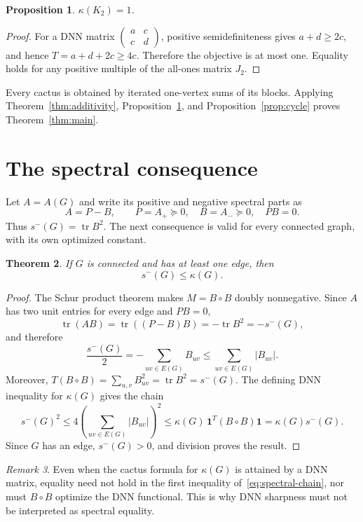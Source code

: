 \documentclass[11pt]{article}
\newtheorem{theorem}{Theorem}[section]
\newtheorem{proposition}[theorem]{Proposition}
\theoremstyle{remark}
\newtheorem{remark}[theorem]{Remark}
\newcommand{\one}{\mathbf 1}
\newcommand{\tr}{\operatorname{tr}}
\begin{document}
\begin{proposition}\label{prop:bridge}
$\kappa(K_2)=1$.
\end{proposition}

\begin{proof}
For a DNN matrix $\left(\begin{smallmatrix}a&c\\c&d\end{smallmatrix}\right)$,
positive semidefiniteness gives $a+d\geq2c$, and hence
$T=a+d+2c\geq4c$.  Therefore the objective is at most one.  Equality holds
for any positive multiple of the all-ones matrix $J_2$.
\end{proof}

Every cactus is obtained by iterated one-vertex sums of its blocks.  Applying
Theorem~\ref{thm:additivity}, Proposition~\ref{prop:bridge}, and
Proposition~\ref{prop:cycle} proves Theorem~\ref{thm:main}.

\section{The spectral consequence}

Let $A=A(G)$ and write its positive and negative spectral parts as
\[
 A=P-B,
 \qquad P=A_+\succeq0,
 \quad B=A_-\succeq0,
 \quad PB=0.
\]
Thus $s^-(G)=\tr B^2$.  The next consequence is valid for every connected
graph, with its own optimized constant.

\begin{theorem}\label{thm:spectral}
If $G$ is connected and has at least one edge, then
\[
 s^-(G)\leq\kappa(G).
\]
\end{theorem}

\begin{proof}
The Schur product theorem makes $M=B\circ B$ doubly nonnegative.  Since
$A$ has two unit entries for every edge and $PB=0$,
\[
 \tr(AB)=\tr((P-B)B)=-\tr B^2=-s^-(G),
\]
and therefore
\[
 \frac{s^-(G)}2=-\sum_{uv\in E(G)}B_{uv}
 \leq\sum_{uv\in E(G)}|B_{uv}|.
\]
Moreover,
$T(B\circ B)=\sum_{u,v}B_{uv}^2=\tr B^2=s^-(G)$.  The defining DNN
inequality for $\kappa(G)$ gives the chain
\begin{equation}\label{eq:spectral-chain}
 s^-(G)^2
 \leq4\left(\sum_{uv\in E(G)}|B_{uv}|\right)^2
 \leq\kappa(G)\,\one^T(B\circ B)\one
 =\kappa(G)s^-(G).
\end{equation}
Since $G$ has an edge, $s^-(G)>0$, and division proves the result.
\end{proof}

\begin{remark}
Even when the cactus formula for $\kappa(G)$ is attained by a DNN matrix,
equality need not hold in the first inequality of~\eqref{eq:spectral-chain},
nor must $B\circ B$ optimize the DNN functional.  This is why DNN sharpness
must not be interpreted as spectral equality.
\end{remark}
\end{document}
